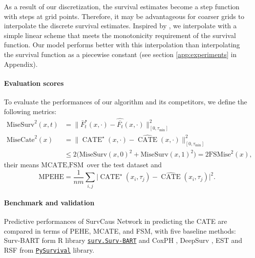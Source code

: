 \documentclass[12pt]{article}
\theoremstyle{plain}
\theoremstyle{definition}
\theoremstyle{remark}
\DeclareMathOperator{\CATE}{\text{CATE}}
\begin{document}
As a result of our discretization, the survival estimates become a step function with steps at grid points. Therefore, it may be advantageous for coarser grids to interpolate the discrete survival estimates. Inspired by \cite{kvamme2019continuous}, we interpolate with a simple linear scheme that meets the monotonicity requirement of the survival function. Our model performs better with this interpolation than interpolating the survival function as a piecewise constant (see section \ref{app:experiments} in Appendix).



\paragraph{Evaluation scores}\label{evalscore}
To evaluate the performances of our algorithm and its competitors, we define the following metrics:
\begin{align*}
  \text{MiseSurv}^2(x,t)&= \big\|\bar{F}_t^{\star}(x,\cdot) -  \widehat{\overline{F_{t}}}(x,\cdot) \big\|_{[0,\tau_{\min}]}^2%
  \\ \text{MiseCate}^2(x)&=\big\|\CATE^{\star}(x,\cdot) - \widehat{\CATE}(x,\cdot) \big\|_{[0,\tau_{\min}]}^2 \\ &\leq 2\big ( \text{MiseSurv}(x,0 )^2 + \text{MiseSurv}(x,1 ) ^2 \big ) =  2\text{FSMise}^2(x),
\end{align*}
their means $\text{MCATE}, \text{FSM}$ over the test dataset and 
\begin{equation*}
    \text{MPEHE}= \frac{1}{nm}\sum_{i,j}^{}\big|\CATE^{\star}(x_i,\tau_j) - \widehat{\CATE}(x_i,\tau_j) \big|^2. 
\end{equation*}

\paragraph{Benchmark and validation}

Predictive performances of SurvCaus Network in predicting the CATE are compared in terms of PEHE, MCATE, and FSM, with five baseline methods:  Surv-BART \cite{Sparapani2016NonparametricSA} form R library \href{https://rdrr.io/cran/BART/man/surv.bart.html}{\texttt{surv.Surv-BART}} and  CoxPH \cite{Buchanan2014WorthTW}, DeepSurv \cite{Katzman2018DeepSurvPT}, EST \cite{Geurts2006ExtremelyRT} and RSF \cite{Ishwaran2008RandomSF} from \href{https://square.github.io/pysurvival/}{\texttt{PySurvival}} library. 
\end{document}
